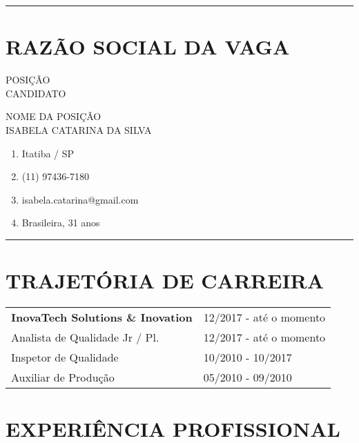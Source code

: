 \documentclass[10.5pt, a4paper]{report}
\begin{document}
\rule{\textwidth}{0.1pt}\vspace{-10pt}

\section{RAZÃO SOCIAL DA VAGA}

\begin{minipage}[t]{0.3\textwidth}
  POSIÇÃO \\
  CANDIDATO
\end{minipage}%
\begin{minipage}[t]{0.4\textwidth}
  NOME DA POSIÇÃO \\
  ISABELA CATARINA DA SILVA
\end{minipage}


\vspace{5pt}


\begin{enumerate}[label={}, leftmargin=0pt, topsep=8pt, itemsep=0pt]
  \item Itatiba / SP
  \item (11) 97436-7180
  \item isabela.catarina@gmail.com
  \item Brasileira, 31 anos
\end{enumerate}


\vspace{-5pt}
\rule{\textwidth}{0.1pt}\vspace{-10pt}

\section{TRAJETÓRIA DE CARREIRA}

{\renewcommand{\arraystretch}{1.6}
\begin{tabular}{@{}p{}p{}@{}}
\textbf{InovaTech Solutions \& Inovation} & 12/2017 - até o momento \\
            Analista de Qualidade Jr / Pl. & 12/2017 - até o momento \\
        Inspetor de Qualidade & 10/2010 - 10/2017 \\
        Auxiliar de Produção & 05/2010 - 09/2010 \\
        \end{tabular}
        }


\section{EXPERIÊNCIA PROFISSIONAL}
\end{document}
